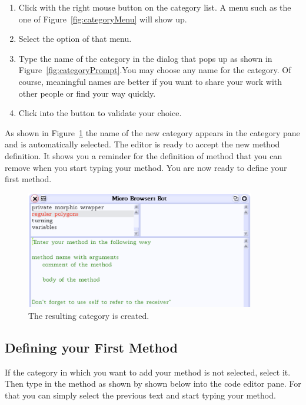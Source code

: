 \begin{enumerate}
\item Click with the right mouse button on the category list.
A menu such as the one of Figure~\ref{fig:categoryMenu} will show up.

\item Select the option  of that menu.

\item Type the name of the category in the dialog that pops up 
as shown in Figure~\ref{fig:categoryPrompt}.You may choose any name for the category. Of course, meaningful names are better if you want to share your work with other people or find
your way quickly. 

\item Click into the  button to validate your  choice.
\end{enumerate}


As shown in Figure~\ref{fig:categorycreated} the name of the
new category appears in the category pane and is automatically
selected. The editor is ready to accept the new method definition. It shows 
you a reminder for the definition of method that you can remove when you start 
typing your method. You are now ready to define your first method.

\begin{figure}
\centerline{\includegraphics[width=10cm]{tbFour}}
\caption{The resulting category is created.\label{fig:categorycreated}}
\end{figure}

\subsection{Defining your First Method}\label{sec:definingmethod}
If the category in which you want to add your method is not selected,
select it. Then type in the method as shown by 
shown below into the code editor pane. For that you can simply select the 
previous text and start typing your method. 


